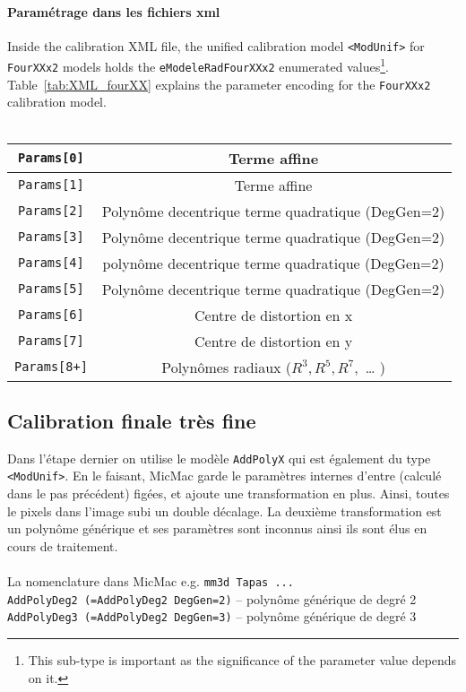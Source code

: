 \documentclass[11pt,a4paper,oneside]{book}
\begin{document}
\paragraph{Paramétrage dans les fichiers xml}
%
Inside the calibration XML file, the unified calibration model {\tt <ModUnif>} for {\tt FourXXx2} models holds the  {\tt eModeleRadFourXXx2} enumerated values\footnote{\label{fn:unif}This sub-type is important as the significance of the parameter value depends on it.}. Table~\ref{tab:XML_fourXX} explains the parameter encoding for the  {\tt FourXXx2} calibration model.\\
%
\\
\begin{tabular} { | c | c | }  
 \hline \hline
{\tt Params[0]} &   Terme affine \\ \hline
{\tt Params[1]} & Terme affine \\ \hline
{\tt Params[2]} &  Polynôme decentrique terme quadratique (DegGen=2) \\ \hline
{\tt Params[3]} &  Polynôme decentrique terme quadratique (DegGen=2) \\ \hline
{\tt Params[4]} &   polynôme decentrique terme quadratique (DegGen=2) \\ \hline
{\tt Params[5]} &  Polynôme decentrique terme quadratique (DegGen=2) \\ \hline
{\tt Params[6]} &  Centre de distortion en x \\ \hline
{\tt Params[7]} &   Centre de distortion en y \\ \hline
{\tt Params[8+]} &   Polynômes radiaux ($R^3, R^5, R^7,$ … ) \\ \hline \hline
  

\end{tabular}\label{tab:XML_fourXX}
%
\subsection{Calibration finale très fine}
%
Dans l'étape dernier on utilise le modèle {\tt AddPolyX} qui est également du type {\tt <ModUnif>}. En le faisant, MicMac garde le paramètres internes d'entre (calculé dans le pas précédent) figées, et ajoute une transformation en plus. Ainsi, toutes le pixels dans l'image subi un double décalage. La deuxième transformation est un polynôme générique et ses paramètres sont inconnus ainsi ils sont élus en cours de traitement.
\\
\\
La nomenclature dans MicMac e.g. {\tt mm3d Tapas ...}\\
{\tt AddPolyDeg2 (=AddPolyDeg2 DegGen=2)} – polynôme générique de degré 2\\ 
{\tt AddPolyDeg3 (=AddPolyDeg2 DegGen=3)} – polynôme générique de degré 3 
%
\end{document}
